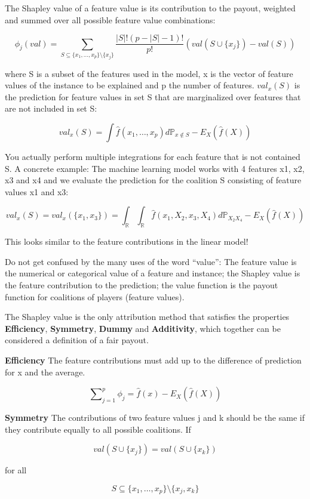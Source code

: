 \documentclass[12pt,]{krantz}
\begin{document}
The Shapley value of a feature value is its contribution to the payout,
weighted and summed over all possible feature value combinations:

\[\phi_j(val)=\sum_{S\subseteq\{x_{1},\ldots,x_{p}\}\setminus\{x_j\}}\frac{|S|!\left(p-|S|-1\right)!}{p!}\left(val\left(S\cup\{x_j\}\right)-val(S)\right)\]

where S is a subset of the features used in the model, x is the vector
of feature values of the instance to be explained and p the number of
features. \(val_x(S)\) is the prediction for feature values in set S
that are marginalized over features that are not included in set S:

\[val_{x}(S)=\int\hat{f}(x_{1},\ldots,x_{p})d\mathbb{P}_{x\notin{}S}-E_X(\hat{f}(X))\]

You actually perform multiple integrations for each feature that is not
contained S. A concrete example: The machine learning model works with 4
features x1, x2, x3 and x4 and we evaluate the prediction for the
coalition S consisting of feature values x1 and x3:

\[val_{x}(S)=val_{x}(\{x_{1},x_{3}\})=\int_{\mathbb{R}}\int_{\mathbb{R}}\hat{f}(x_{1},X_{2},x_{3},X_{4})d\mathbb{P}_{X_2X_4}-E_X(\hat{f}(X))\]

This looks similar to the feature contributions in the linear model!

Do not get confused by the many uses of the word ``value'': The feature
value is the numerical or categorical value of a feature and instance;
the Shapley value is the feature contribution to the prediction; the
value function is the payout function for coalitions of players (feature
values).

The Shapley value is the only attribution method that satisfies the
properties \textbf{Efficiency}, \textbf{Symmetry}, \textbf{Dummy} and
\textbf{Additivity}, which together can be considered a definition of a
fair payout.

\textbf{Efficiency} The feature contributions must add up to the
difference of prediction for x and the average.

\[\sum\nolimits_{j=1}^p\phi_j=\hat{f}(x)-E_X(\hat{f}(X))\]

\textbf{Symmetry} The contributions of two feature values j and k should
be the same if they contribute equally to all possible coalitions. If

\[val(S\cup\{x_j\})=val(S\cup\{x_k\})\]

for all

\[S\subseteq\{x_{1},\ldots,x_{p}\}\setminus\{x_j,x_k\}\]
\end{document}
